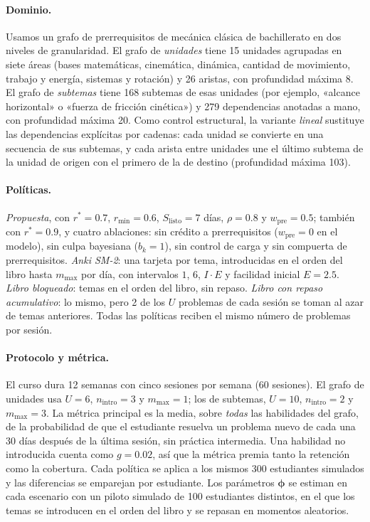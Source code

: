 \documentclass[runningheads]{llncs}
\newcommand{\rstar}{r^{\ast}}
\newcommand{\Slisto}{S_{\mathrm{listo}}}
\begin{document}
\paragraph{Dominio.} Usamos un grafo de prerrequisitos de mecánica clásica de bachillerato en dos niveles de granularidad. El grafo de \emph{unidades} tiene 15 unidades agrupadas en siete áreas (bases matemáticas, cinemática, dinámica, cantidad de movimiento, trabajo y energía, sistemas y rotación) y 26 aristas, con profundidad máxima 8. El grafo de \emph{subtemas} tiene 168 subtemas de esas unidades (por ejemplo, «alcance horizontal» o «fuerza de fricción cinética») y 279 dependencias anotadas a mano, con profundidad máxima 20. Como control estructural, la variante \emph{lineal} sustituye las dependencias explícitas por cadenas: cada unidad se convierte en una secuencia de sus subtemas, y cada arista entre unidades une el último subtema de la unidad de origen con el primero de la de destino (profundidad máxima 103).

\paragraph{Políticas.} \emph{Propuesta}, con $\rstar=0.7$, $r_{\min}=0.6$, $\Slisto=7$ días, $\rho=0.8$ y $w_{\mathrm{pre}}=0.5$; también con $\rstar=0.9$, y cuatro ablaciones: sin crédito a prerrequisitos ($w_{\mathrm{pre}}=0$ en el modelo), sin culpa bayesiana ($b_k=1$), sin control de carga y sin compuerta de prerrequisitos. \emph{Anki SM-2}: una tarjeta por tema, introducidas en el orden del libro hasta $m_{\max}$ por día, con intervalos $1$, $6$, $I\cdot E$ y facilidad inicial $E=2.5$. \emph{Libro bloqueado}: temas en el orden del libro, sin repaso. \emph{Libro con repaso acumulativo}: lo mismo, pero 2 de los $U$ problemas de cada sesión se toman al azar de temas anteriores. Todas las políticas reciben el mismo número de problemas por sesión.

\paragraph{Protocolo y métrica.} El curso dura 12 semanas con cinco sesiones por semana (60 sesiones). El grafo de unidades usa $U=6$, $n_{\mathrm{intro}}=3$ y $m_{\max}=1$; los de subtemas, $U=10$, $n_{\mathrm{intro}}=2$ y $m_{\max}=3$. La métrica principal es la media, sobre \emph{todas} las habilidades del grafo, de la probabilidad de que el estudiante resuelva un problema nuevo de cada una 30 días después de la última sesión, sin práctica intermedia. Una habilidad no introducida cuenta como $g=0.02$, así que la métrica premia tanto la retención como la cobertura. Cada política se aplica a los mismos 300 estudiantes simulados y las diferencias se emparejan por estudiante. Los parámetros $\bm\phi$ se estiman en cada escenario con un piloto simulado de 100 estudiantes distintos, en el que los temas se introducen en el orden del libro y se repasan en momentos aleatorios.
\end{document}
